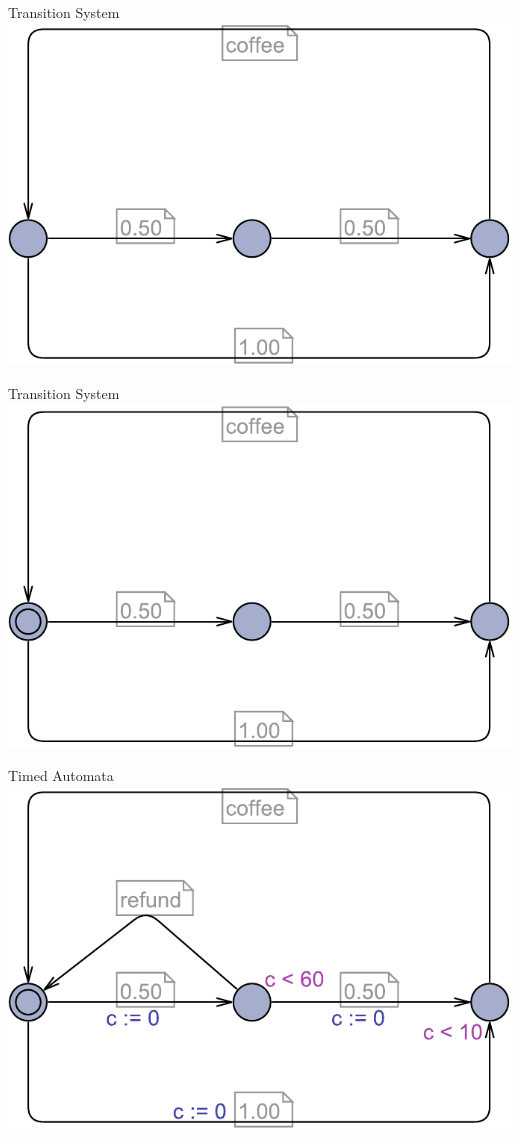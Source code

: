 \begin{frame}{Transition System}
\includegraphics[height=0.85\textheight, width=.95\textwidth, keepaspectratio=true]{img/Koffie_states_transitions}
\end{frame}

\begin{frame}{Transition System}
\includegraphics[height=0.85\textheight, width=.95\textwidth, keepaspectratio=true]{img/Koffie_automaton}
\end{frame}

\begin{frame}{Timed Automata}
\includegraphics[height=0.85\textheight, width=.95\textwidth, keepaspectratio=true]{img/Koffie_complete}
\end{frame}



